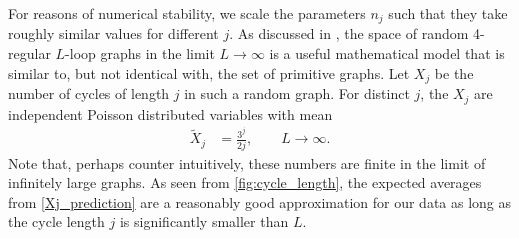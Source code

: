 \documentclass[12pt]{article}
\numberwithin{equation}{section}
\begin{document}
For reasons of numerical stability, we scale the parameters $n_j$ such that they take roughly similar values for different $j$. 
As discussed in \cite{balduf_statistics_2023}, the space of random 4-regular $L$-loop graphs in the limit $L \rightarrow\infty$ is a useful mathematical model that is similar to, but not identical with, the set of primitive graphs. Let $X_j$ be the number of cycles of length $j$ in such a random graph. For distinct $j$, the $X_j$ are  independent Poisson distributed variables with mean  \cite{bollobas_probabilistic_1980,mckay_short_2004}
\begin{align}\label{Xj_prediction}
	\tilde   X_j   &= \frac{3^j}{2j}, \qquad L \rightarrow \infty. 
\end{align}
Note that, perhaps counter intuitively, these numbers are finite in the limit of  infinitely large graphs.  As seen from \cref{fig:cycle_length}, the expected averages from \cref{Xj_prediction} are a reasonably  good approximation for our data as long as the cycle length $j$ is significantly smaller than $L$.
\end{document}
